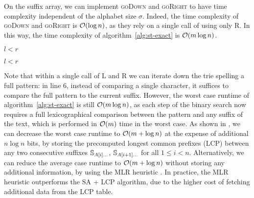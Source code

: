 On the suffix array, we can implement \textsc{goDown} and \textsc{goRight} to have time complexity independent of the alphabet size $\sigma$.
Indeed, the time complexity of \textsc{goDown} and \textsc{goRight} is $\mathcal{O}(\log{n})$, as they rely on a single call of using only \textsc{R}.
In this way, the time complexity of algorithm~\ref{alg:st-exact} is $\mathcal{O}(m \log{n})$.

\begin{algorithm}[h!]
\begin{minipage}[t]{.5\textwidth}
\label{alg:sa-godown}
\begin{algorithmic}[1]
		\State \Return \False
	\EndIf
	\EndIf
	\State \Return $l < r$
\EndProcedure
\end{algorithmic}
\end{minipage}
\begin{minipage}[t]{.5\textwidth}
\label{alg:sa-goright}
\begin{algorithmic}[1]
		\State \Return \False
	\EndIf
	\EndIf
	\State \Return $l < r$
\EndProcedure
\end{algorithmic}
\end{minipage}
\end{algorithm}

Note that within a single call of \textsc{L} and \textsc{R} we can iterate down the trie spelling a full pattern: in line 6, instead of comparing a single character, it suffices to compare the full pattern to the current suffix.
However, the worst case runtime of algorithm~\ref{alg:st-exact} is still $\mathcal{O}(m \log{n})$, as each step of the binary search now requires a full lexicographical comparison between the pattern and any suffix of the text, which is performed in $\mathcal{O}(m)$ time in the worst case.
As shown in \citep{Manber1990}, we can decrease the worst case runtime to $\mathcal{O}(m + \log{n})$ at the expense of additional $n \log{n}$ bits, by storing the precomputed longest common prefixes (LCP) between any two consecutive suffixes $\mathbb {S}_{A[i] \dots}$, $\mathbb {S}_{A[i+1] \dots}$ for all $1 \leq i < n$.
Alternatively, we can reduce the average case runtime to $\mathcal{O}(m + \log{n})$ without storing any additional information, by using the MLR heuristic \citep{Manber1990}.
In practice, the MLR heuristic outperforms the SA + LCP algorithm, due to the higher cost of fetching additional data from the LCP table.

